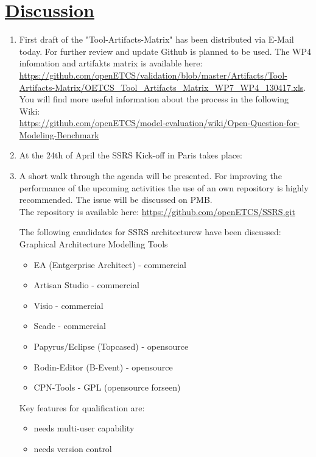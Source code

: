 \documentclass[a4paper]{article}
\begin{document}
\section*{\underline{Discussion}}
\begin{enumerate}
\item First draft of the "Tool-Artifacts-Matrix"
has been distributed via E-Mail today. For further review and update Github is planned to be used. The WP4 infomation and artifakts matrix is available here:\\
\url{https://github.com/openETCS/validation/blob/master/Artifacts/Tool-Artifacts-Matrix/OETCS_Tool_Artifacts_Matrix_WP7_WP4_130417.xls}.\\
You will find more useful information about the process in the following Wiki:\\
\url{https://github.com/openETCS/model-evaluation/wiki/Open-Question-for-Modeling-Benchmark}

\item At the 24th of April the SSRS Kick-off in Paris takes place:
\item A short walk through the agenda will be presented.
For improving the performance of the upcoming activities the use of an own repository is highly recommended. The issue will be discussed on PMB.\\
The repository is available here:
\url{https://github.com/openETCS/SSRS.git}

The following candidates for SSRS architecturew have been discussed:\\
Graphical Architecture Modelling Tools
\begin{itemize}
\item EA (Entgerprise Architect) - commercial
\item Artisan Studio    - commercial
\item Visio      - commercial
\item Scade      - commercial
\item Papyrus/Eclipse (Topcased) - opensource
\item Rodin-Editor (B-Event)  - opensource
\item CPN-Tools     - GPL (opensource forseen)
\end{itemize}

Key features for qualification are:
\begin{itemize}
\item  needs multi-user capability
\item  needs version control
\end{itemize}


\end{enumerate}
\end{document}

